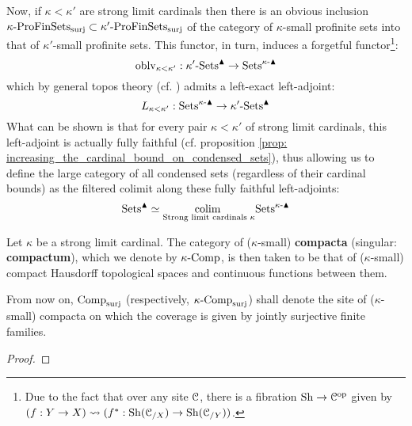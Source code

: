 \begin{remark}
                Now, if $\kappa < \kappa'$ are strong limit cardinals then there is an obvious inclusion $\kappa\text{-}\mathrm{Pro}\mathrm{Fin}\mathrm{Sets}_{\mathrm{surj}} \subset \kappa'\text{-}\mathrm{Pro}\mathrm{Fin}\mathrm{Sets}_{\mathrm{surj}}$ of the category of $\kappa$-small profinite sets into that of $\kappa'$-small profinite sets. This functor, in turn, induces a forgetful functor\footnote{Due to the fact that over any site $\mathcal{C}$, there is a fibration $\mathrm{Sh} \to \mathcal{C}^{\mathrm{op}}$ given by $(f: Y \to X) \leadsto (f^*: \mathrm{Sh}({\mathcal{C}_{/X}}) \to \mathrm{Sh}(\mathcal{C}_{/Y}))$.}:
                    $$\mathrm{oblv}_{\kappa < \kappa'}: \kappa'\text{-}\mathrm{Sets}^{\blacktriangle} \to \mathrm{Sets}^{\kappa\text{-}\blacktriangle}$$
                which by general topos theory (cf. \cite[Expos\'e IV]{sga4}) admits a left-exact left-adjoint:
                    $$L_{\kappa < \kappa'}: \mathrm{Sets}^{\kappa\text{-}\blacktriangle} \to \kappa'\text{-}\mathrm{Sets}^{\blacktriangle}$$
                What can be shown is that for every pair $\kappa < \kappa'$ of strong limit cardinals, this left-adjoint is actually fully faithful (cf. proposition \ref{prop: increasing_the_cardinal_bound_on_condensed_sets}), thus allowing us to define the large category of all condensed sets (regardless of their cardinal bounds) as the filtered colimit along these fully faithful left-adjoints:
                    $$\mathrm{Sets}^{\blacktriangle} \simeq \underset{ \text{Strong limit cardinals $\kappa$} }{\operatorname{colim} \:} \mathrm{Sets}^{\kappa\text{-}\blacktriangle}$$
            \end{remark}
            \begin{definition}[Compacta] \label{def: compacta}
                Let $\kappa$ be a strong limit cardinal. The category of ($\kappa$-small) \textbf{compacta} (singular: \textbf{compactum}), which we denote by $\kappa\text{-}\mathrm{Comp}$, is then taken to be that of ($\kappa$-small) compact Hausdorff topological spaces and continuous functions between them. 
            \end{definition}
            \begin{convention} \label{conv: site_of_compacta}
                From now on, $\mathrm{Comp}_{\mathrm{surj}}$ (respectively, $\kappa\text{-}\mathrm{Comp}_{\mathrm{surj}}$) shall denote the site of ($\kappa$-small) compacta on which the coverage is given by jointly surjective finite families.
            \end{convention}
            \begin{lemma}
                
            \end{lemma}
                \begin{proof}
                    
                \end{proof}
